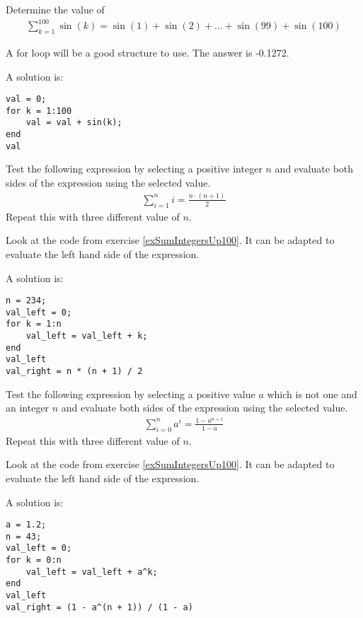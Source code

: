\begin{ex}
Determine the value of 
\begin{align*}
\sum_{k = 1}^{100} \sin(k) = \sin(1) + \sin(2) + \ldots + \sin(99) + \sin(100)
\end{align*}
\begin{hint}
A for loop will be a good structure to use.
The answer is -0.1272.
\end{hint}
\begin{sol}
A solution is:
\begin{lstlisting}
val = 0;
for k = 1:100
    val = val + sin(k);
end
val
\end{lstlisting}
\end{sol}
\end{ex}


\begin{ex}
Test the following expression by selecting a positive integer $n$
and evaluate both sides of the expression using the selected value.
\begin{align*}
\sum_{i = 1}^n i = \frac{n \cdot (n + 1)}{2}
\end{align*}
Repeat this with three different value of $n$.
\begin{hint}
Look at the code from exercise \ref{exSumIntegersUp100}.
It can be adapted to evaluate the left hand side of the expression.
\end{hint}
\begin{sol}
A solution is:
\begin{lstlisting}
n = 234;
val_left = 0;
for k = 1:n
    val_left = val_left + k;
end
val_left
val_right = n * (n + 1) / 2
\end{lstlisting}
\end{sol}
\end{ex}


\begin{ex}
Test the following expression by selecting a positive value $a$
which is not one and an integer $n$
and evaluate both sides of the expression using the selected value.
\begin{align*}
\sum_{i = 0}^n a^i = \frac{1 - a^{n + 1}}{1 - a}
\end{align*}
Repeat this with three different value of $n$.
\begin{hint}
Look at the code from exercise \ref{exSumIntegersUp100}.
It can be adapted to evaluate the left hand side of the expression.
\end{hint}
\begin{sol}
A solution is:
\begin{lstlisting}
a = 1.2;
n = 43;
val_left = 0;
for k = 0:n
    val_left = val_left + a^k;
end
val_left
val_right = (1 - a^(n + 1)) / (1 - a)
\end{lstlisting}
\end{sol}
\end{ex}


